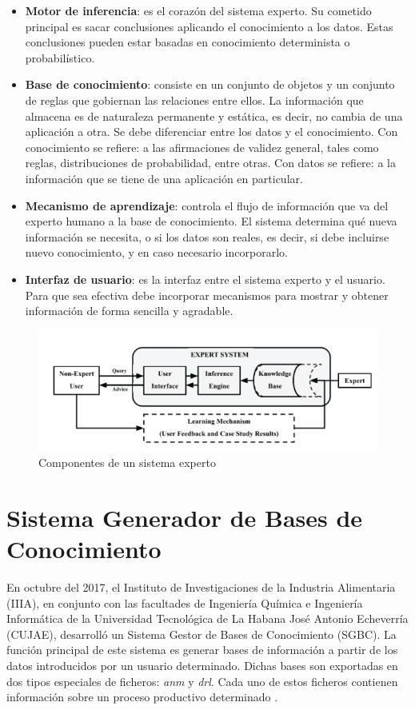 \begin{itemize}
\item \textbf{Motor de inferencia}: es el corazón del sistema experto. Su cometido principal es sacar conclusiones aplicando el conocimiento a los datos. Estas conclusiones pueden estar basadas en conocimiento determinista o probabilístico.
\item \textbf{Base de conocimiento}: consiste en un conjunto de objetos y un conjunto de reglas que gobiernan las relaciones entre ellos. La información que almacena es de naturaleza permanente y estática, es decir, no cambia de una aplicación a otra. Se debe diferenciar entre los datos y el conocimiento. Con conocimiento se refiere: a las afirmaciones de validez general, tales como reglas, distribuciones de probabilidad, entre otras. Con datos se refiere: a la información que se tiene de una aplicación en particular.
\item \textbf{Mecanismo de aprendizaje}: controla el flujo de información que va del experto humano a la base de conocimiento. El sistema determina qué nueva información se necesita, o si los datos son reales, es decir, si debe incluirse nuevo conocimiento, y en caso necesario incorporarlo.
\item \textbf{Interfaz de usuario}: es la interfaz entre el sistema experto y el usuario. Para que sea efectiva debe incorporar mecanismos para mostrar y obtener información de forma sencilla y agradable.
\end{itemize}

\begin{figure}[h]
\centering
 \includegraphics[width=0.7\linewidth]{imagen/componentes.png}
 \caption{Componentes de un sistema experto}
 \label{fig:componentes} 
\end{figure}


\section{Sistema Generador de Bases de Conocimiento}
En octubre del 2017, el Instituto de Investigaciones de la Industria Alimentaria (IIIA), en conjunto con las facultades de Ingeniería Química e Ingeniería Informática de la Universidad Tecnológica de La Habana José Antonio Echeverría (CUJAE), desarrolló un Sistema Gestor de Bases de Conocimiento (SGBC). La función principal de este sistema es generar bases de información a partir de los datos introducidos por un usuario determinado. Dichas bases son exportadas en dos tipos especiales de ficheros: \textsl{anm} y \textsl{drl}. Cada uno de estos ficheros contienen información sobre un proceso productivo determinado \cite{Lemus2018}.

